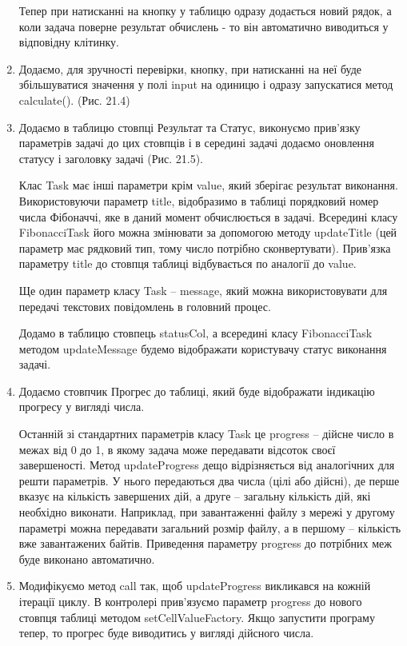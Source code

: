 \begin{enumerate}
	Тепер при натисканні на кнопку у таблицю одразу додається новий рядок, а коли задача поверне результат обчислень - то він автоматично виводиться у відповідну клітинку.

	\item Додаємо, для зручності перевірки, кнопку, при натисканні на неї буде збільшуватися значення у полі input на одиницю і одразу запускатися метод calculate(). (Рис. 21.4)

	\item Додаємо в таблицю стовпці Результат та Статус, виконуємо прив’язку параметрів задачі до цих стовпців і в середині задачі додаємо оновлення статусу і заголовку задачі (Рис. 21.5).

	Клас Task має інші параметри крім value, який зберігає результат виконання. Використовуючи параметр title, відобразимо в таблиці порядковий номер числа Фібоначчі, яке в даний момент обчислюється в задачі. Всередині класу FibonacciTask його можна змінювати за допомогою методу updateTitle (цей параметр має рядковий тип, тому число потрібно сконвертувати). Прив'язка параметру title до стовпця таблиці відбувається по аналогії до value.

	Ще один параметр класу Task – message, який можна використовувати для передачі текстових повідомлень в головний процес. 

	Додамо в таблицю стовпець statusCol, а всередині класу FibonacciTask методом updateMessage будемо відображати користувачу статус виконання задачі.

	\item Додаємо стовпчик Прогрес до таблиці, який буде відображати індикацію прогресу у вигляді числа.

	Останній зі стандартних параметрів класу Task це progress – дійсне число в межах від 0 до 1, в якому задача може передавати відсоток своєї завершеності. Метод updateProgress дещо відрізняється від аналогічних для решти параметрів. У нього передаються два числа (цілі або дійсні), де перше вказує на кількість завершених дій, а друге – загальну кількість дій, які необхідно виконати. Наприклад, при завантаженні файлу з мережі у другому параметрі можна передавати загальний розмір файлу, а в першому – кількість вже завантажених байтів. Приведення параметру progress до потрібних меж буде виконано автоматично.

	\item Модифікуємо метод call так, щоб updateProgress викликався на кожній ітерації циклу. 
В контролері прив'язуємо параметр progress до нового стовпця таблиці методом setCellValueFactory. Якщо запустити програму тепер, то прогрес буде виводитись у вигляді дійсного числа. 


\end{enumerate}
